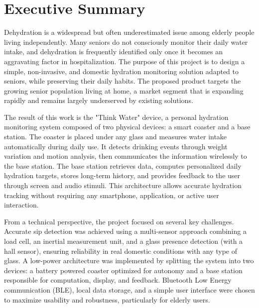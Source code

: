 \documentclass{article}
\begin{document}
\setcounter{page}{1}
\section*{Executive Summary}
Dehydration is a widespread but often underestimated issue among elderly people living independently. Many seniors do not consciously monitor their daily water intake, and dehydration is frequently identified only once it becomes an aggravating factor in hospitalization. The purpose of this project is to design a simple, non-invasive, and domestic hydration monitoring solution adapted to seniors, while preserving their daily habits. The proposed product targets the growing senior population living at home, a market segment that is expanding rapidly and remains largely underserved by existing solutions.\vspace{0.2cm}

The result of this work is the "Think Water" device, a personal hydration monitoring system composed of two physical devices: a smart coaster and a base station. The coaster is placed under any glass and measures water intake automatically during daily use. It detects drinking events through weight variation and motion analysis, then communicates the information wirelessly to the base station. The base station retrieves data, computes personalized daily hydration targets, stores long-term history, and provides feedback to the user through screen and audio stimuli. This architecture allows accurate hydration tracking without requiring any smartphone, application, or active user interaction.\vspace{0.2cm}

From a technical perspective, the project focused on several key challenges. Accurate sip detection was achieved using a multi-sensor approach combining a load cell, an inertial measurement unit, and a glass presence detection (with a hall sensor), ensuring reliability in real domestic conditions with any type of glass. A low-power architecture was implemented by splitting the system into two devices: a battery powered coaster optimized for autonomy and a base station responsible for computation, display, and feedback. Bluetooth Low Energy communication (BLE), local data storage, and a simple user interface were chosen to maximize usability and robustness, particularly for elderly users.\vspace{0.2cm}
\end{document}
